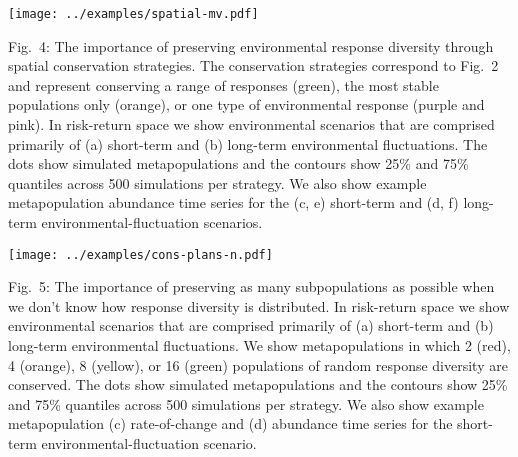 \clearpage
\texttt{[image: ../examples/spatial-mv.pdf]}

Fig.~4: The importance of preserving environmental response diversity through spatial conservation strategies. The conservation strategies correspond to Fig.~2 and represent conserving a range of responses (green), the most stable populations only (orange), or one type of environmental response (purple and pink). In risk-return space we show environmental scenarios that are comprised primarily of (a) short-term and (b) long-term environmental fluctuations. The dots show simulated metapopulations and the contours show 25\% and 75\% quantiles across 500 simulations per strategy. We also show example metapopulation abundance time series for the (c, e) short-term and (d, f) long-term environmental-fluctuation scenarios.

\clearpage
\texttt{[image: ../examples/cons-plans-n.pdf]}

Fig.~5: The importance of preserving as many subpopulations as possible when we don't know how response diversity is distributed. In risk-return space we show environmental scenarios that are comprised primarily of (a) short-term and (b) long-term environmental fluctuations. We show metapopulations in which 2 (red), 4 (orange), 8 (yellow), or 16 (green) populations of random response diversity are conserved. The dots show simulated metapopulations and the contours show 25\% and 75\% quantiles across 500 simulations per strategy. We also show example metapopulation (c) rate-of-change and (d) abundance time series for the short-term environmental-fluctuation scenario.
